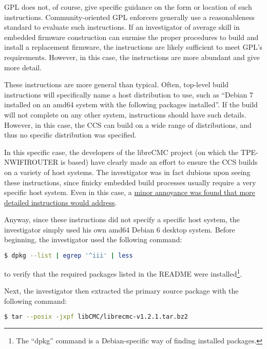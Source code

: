 GPL does not, of course, give specific guidance on the form or location of
such instructions.  Community-oriented GPL enforcers generally use a
reasonableness standard to evaluate such instructions.  If an investigator of
average skill in embedded firmware construction can surmise the proper
procedures to build and install a replacement firmware, the instructions are
likely sufficient to meet GPL's requirements.  However, in this case, the
instructions are more abundant and give more detail.

These instructions are more general than typical.  Often, top-level build
instructions will specifically name a host distribution to use, such as
``Debian 7 installed on an amd64 system with the following packages
installed''.  If the build will not complete on any other system,
instructions should have such details.  However, in this case, the CCS can
build on a wide range of distributions, and thus no specific distribution was
specified.

\label{thinkpenguin-specific-host-system}

In this specific case, the developers of the libreCMC project (on which the
TPE-NWIFIROUTER is based) have clearly made an effort to ensure the CCS builds
on a variety of host systems.  The investigator was in fact dubious upon
seeing these instructions, since finicky embedded build processes usually
require a very specific host system.   Even in this case, a
\hyperref[thinkpenguin-glibc-214-issue]{minor annoyance was found that more
  detailed instructions would address}.

Anyway, since these instructions did not specify a specific host system, the
investigator simply used his own amd64 Debian 6 desktop system.  Before
beginning, the investigator used the following command:

\lstset{tabsize=2}
\begin{lstlisting}[language=bash]
  $ dpkg --list | egrep '^iii' | less
\end{lstlisting}

to verify that the required packages listed in the README were
installed\footnote{The ``dpkg'' command is a Debian-specific way of
  finding installed packages.}.


Next, the investigator then extracted the primary source package with the
following command:

\lstset{tabsize=2}
\begin{lstlisting}[language=bash]
  $ tar --posix -jxpf libCMC/librecmc-v1.2.1.tar.bz2
\end{lstlisting}

